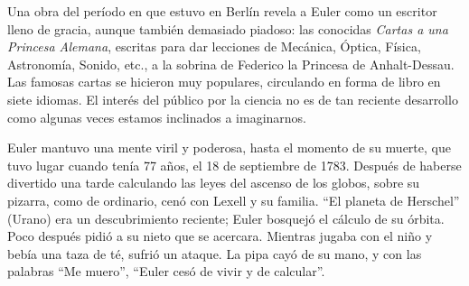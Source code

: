 \documentclass[a4paper, 12pt]{article}
\begin{document}
Una obra del período en que estuvo en Berlín revela a Euler como un escritor lleno de gracia, aunque también demasiado piadoso: las conocidas {\it Cartas a una Princesa Alemana}, escritas para dar lecciones de Mecánica, Óptica, Física, Astronomía, Sonido, etc., a la sobrina de Federico la Princesa de Anhalt-Dessau. Las famosas cartas se hicieron muy populares, circulando en forma de libro en siete idiomas. El interés del público por la ciencia no es de tan reciente desarrollo como algunas veces estamos inclinados a imaginarnos.

Euler mantuvo una mente viril y poderosa, hasta el momento de su muerte, que tuvo lugar cuando tenía 77 años, el 18 de septiembre de 1783. Después de haberse divertido una tarde calculando las leyes del ascenso de los globos, sobre su pizarra, como de ordinario, cenó con Lexell y su familia. ``El planeta de Herschel'' (Urano) era un descubrimiento reciente; Euler bosquejó el cálculo de su órbita. Poco después pidió a su nieto que se acercara. Mientras jugaba con el niño y bebía una taza de té, sufrió un ataque. La pipa cayó de su mano, y con las palabras ``Me muero'', ``Euler cesó de vivir y de calcular''.
\end{document}
